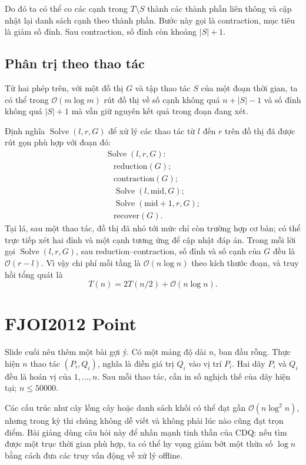 \documentclass[11pt]{article}
\newcommand{\Oh}{\mathcal{O}}
\newcommand{\midp}{\mathrm{mid}}
\newcommand{\Solve}{\operatorname{Solve}}
\begin{document}
Do đó ta có thể co các cạnh trong \(T\setminus S\) thành các thành phần liên
thông và cập nhật lại danh sách cạnh theo thành phần. Bước này gọi là
contraction, mục tiêu là giảm số đỉnh. Sau contraction, số đỉnh còn khoảng
\(|S|+1\).

\subsection{Phân trị theo thao tác}

Từ hai phép trên, với một đồ thị \(G\) và tập thao tác \(S\) của một đoạn thời
gian, ta có thể trong \(\Oh(m\log m)\) rút đồ thị về số cạnh không quá
\(n+|S|-1\) và số đỉnh không quá \(|S|+1\) mà vẫn giữ nguyên kết quả trong
đoạn đang xét.

Định nghĩa \(\Solve(l,r,G)\) để xử lý các thao tác từ \(l\) đến \(r\) trên đồ
thị đã được rút gọn phù hợp với đoạn đó:
\[
\begin{array}{l}
\Solve(l,r,G):\\
\quad \text{reduction}(G);\\
\quad \text{contraction}(G);\\
\quad \Solve(l,\midp,G);\\
\quad \Solve(\midp+1,r,G);\\
\quad \text{recover}(G).
\end{array}
\]
Tại lá, sau một thao tác, đồ thị đã nhỏ tới mức chỉ còn trường hợp cơ bản; có
thể trực tiếp xét hai đỉnh và một cạnh tương ứng để cập nhật đáp án. Trong
mỗi lời gọi \(\Solve(l,r,G)\), sau reduction--contraction, số đỉnh và số cạnh
của \(G\) đều là \(\Oh(r-l)\). Vì vậy chi phí mỗi tầng là \(\Oh(n\log n)\) theo
kích thước đoạn, và truy hồi tổng quát là
\[
  T(n)=2T(n/2)+\Oh(n\log n).
\]

\section{FJOI2012 Point}

Slide cuối nêu thêm một bài gợi ý. Có một mảng độ dài \(n\), ban đầu rỗng.
Thực hiện \(n\) thao tác \((P_i,Q_i)\), nghĩa là điền giá trị \(Q_i\) vào vị
trí \(P_i\). Hai dãy \(P_i\) và \(Q_i\) đều là hoán vị của \(1,\ldots,n\). Sau
mỗi thao tác, cần in số nghịch thế của dãy hiện tại; \(n\le 50000\).

Các cấu trúc như cây lồng cây hoặc danh sách khối có thể đạt gần
\(\Oh(n\log^2 n)\), nhưng trong kỳ thi chúng không dễ viết và không phải lúc
nào cũng đạt trọn điểm. Bài giảng dùng câu hỏi này để nhấn mạnh tinh thần của
CDQ: nếu tìm được một trục thời gian phù hợp, ta có thể hy vọng giảm bớt một
thừa số \(\log n\) bằng cách đưa các truy vấn động về xử lý offline.
\end{document}
